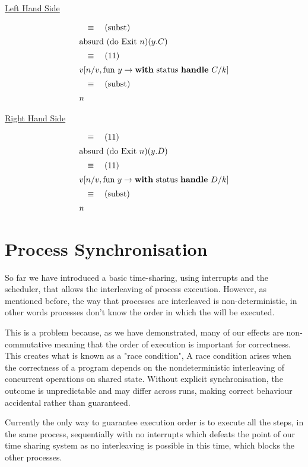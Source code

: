 \documentclass[logo,bsc,singlespacing,parskip]{infthesis}
\begin{document}
\underline{Left Hand Side}

\[
\begin{array}{l}
\quad\equiv\quad (\text{subst}) \\[5pt]
\text{absurd (do Exit } n) (y. C) \\[5pt]
\quad\equiv\quad (11) \\[5pt]
v [n/v, \text{fun } y \rightarrow \text{\textbf{with} status \textbf{handle} } C/k] \\[5pt]
\quad\equiv\quad (\text{subst}) \\[5pt]
n
\end{array}
\]

\underline{Right Hand Side}

\[
\begin{array}{l}
\quad\equiv\quad (11) \\[5pt]
\text{absurd (do Exit } n) (y. D) \\[5pt]
\quad\equiv\quad (11) \\[5pt]
v [n/v, \text{fun } y \rightarrow \text{\textbf{with} status \textbf{handle} } D/k] \\[5pt]
\quad\equiv\quad (\text{subst}) \\[5pt]
n
\end{array}
\]


\section{Process Synchronisation}

So far we have introduced a basic time-sharing, using interrupts and the scheduler, that allows the interleaving of process execution. However, as mentioned before, the way that processes are interleaved is non-deterministic, in other words processes don't know the order in which the will be executed. 

This is a problem because, as we have demonstrated, many of our effects are non-commutative meaning that the order of execution is important for correctness. This creates what is known as a "race condition", A race condition arises when the correctness of a program depends on the nondeterministic interleaving of concurrent operations on shared state. Without explicit synchronisation, the outcome is unpredictable and may differ across runs, making correct behaviour accidental rather than guaranteed.

Currently the only way to guarantee execution order is to execute all the steps, in the same process, sequentially with no interrupts which defeats the point of our time sharing system as no interleaving is possible in this time, which blocks the other processes.
\end{document}
